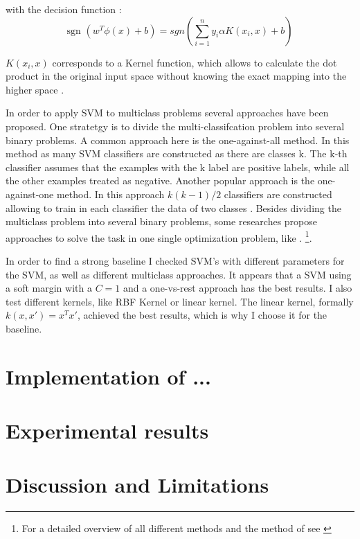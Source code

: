 \documentclass[12pt, a4paper, titlepage]{article}
\begin{document}
with the decision function \citep{Chang2001}:
\[\text{sgn } (w^T\phi(x)+b) = sgn(\sum_{i=1}^n y_i \alpha K(x_i, x) +b)\]

$K(x_i, x)$ corresponds to a Kernel function, which allows to calculate the dot product in the original input space without knowing the exact mapping into the higher space \citep{Han2012, Jordan2006}. 

In order to apply \ac{SVM} to multiclass problems several approaches have been proposed. One stratetgy is to divide the multi-classifcation problem into several binary problems. A common approach here is the one-against-all method. In this method as many \ac{SVM} classifiers are constructed as there are classes k. The k-th classifier assumes that the examples with the k label are positive labels, while all the other examples treated as negative. Another popular approach is the one-against-one method. In this approach $k(k-1)/2$ classifiers are constructed allowing to train in each classifier the data of two classes \citep{Hsu2002}. Besides dividing the multiclass problem into several binary problems, some researches propose approaches to solve the task in one single optimization problem, like \citet{Crammer2001}. \footnote{For a detailed overview of all different methods and the method of \citet{Crammer2001} see \citet{Hsu2002,Crammer2001}}. 

In order to find a strong baseline I checked \ac{SVM}'s with different parameters for the \ac{SVM}, as well as different multiclass approaches. It appears that a SVM using a soft margin with a $C=1$ and a one-vs-rest approach has the best results. I also test different kernels, like  RBF Kernel or linear kernel. The linear kernel, formally  $k(x, x') = x^Tx'$, achieved the best results, which is why I choose it for the baseline. 

\section{Implementation of ...}

\section{Experimental results}
\section{Discussion and Limitations}
\end{document}
